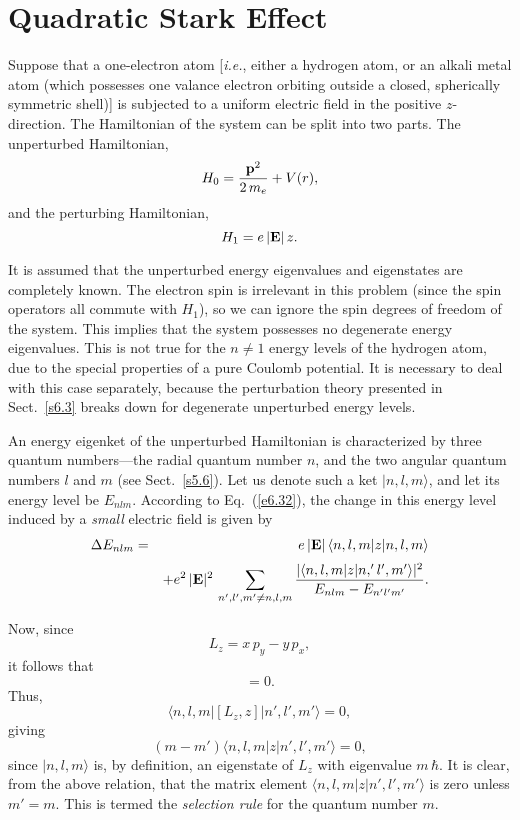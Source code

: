 \section{Quadratic Stark Effect}\label{s6.4}
Suppose that a one-electron atom [{\em i.e.}, either a hydrogen atom, or an alkali metal
atom (which possesses  one valance electron orbiting outside a closed, spherically
symmetric shell)] is subjected to a uniform electric field in the positive
$z$-direction. The Hamiltonian of the system can be split into two
parts. The unperturbed Hamiltonian,
\begin{equation}
H_0 = \frac{{\bf p}^2}{2\,m_e} + V(r),
\end{equation}
and the perturbing Hamiltonian,
\begin{equation}
H_1=  e\, |{\bf E}|\, z.
\end{equation}

It is assumed that the unperturbed energy eigenvalues and eigenstates are completely
known. The electron spin is irrelevant in this problem (since the spin operators
all commute with $H_1$), so we can ignore the spin degrees of freedom of the system.
This implies that the system possesses no degenerate energy eigenvalues. This is
not true for the $n\neq 1$ energy levels of the hydrogen atom, due to the special
properties of a pure Coulomb potential. 
It is necessary to deal with this case separately, because
the perturbation theory presented in Sect.~\ref{s6.3} breaks down  for  degenerate
unperturbed energy levels. 

An  energy eigenket of the unperturbed Hamiltonian is characterized by three quantum numbers---the radial quantum number $n$, and the two angular quantum numbers $l$ and
$m$ (see Sect.~\ref{s5.6}). Let us denote such a ket $|n,l,m\rangle$, and let its
energy level be $E_{nlm}$. According to Eq.~(\ref{e6.32}), the change in this
energy level  induced by a {\em small} electric field is given by
\begin{eqnarray}
\Delta E_{nlm}&=&e\,|{\bf E}|\, \langle n,l,m |z|n,l,m\rangle
\nonumber\\[0.5ex]
&&+ e^2 \,|{\bf E}|^2\,\sum_{n',l',m'\neq n,l,m} \frac{|\langle 
n,l,m|z| n,'l',m'\rangle|^2}{ E_{nlm}-E_{n'l'm'} }.\label{e6.38}
\end{eqnarray}

Now, since
\begin{equation}
L_z = x\,p_y - y\, p_x,
\end{equation}
it follows that
\begin{equation}
[L_z, z] = 0.
\end{equation}
Thus,
\begin{equation}
\langle n,l, m| [L_z, z] | n',l',m'\rangle = 0,
\end{equation}
giving 
\begin{equation}
(m - m') \langle  n,l, m|z| n',l',m'\rangle = 0,
\end{equation}
since $|n,l,m\rangle$ is, by definition, an eigenstate of $L_z$ with eigenvalue
$m\,\hbar$. It is clear, from the above relation, that
the matrix element $\langle  n,l, m|z| n',l',m'\rangle$ is zero unless $m'=m$. 
This is termed the {\em selection rule} for the quantum number $m$.

